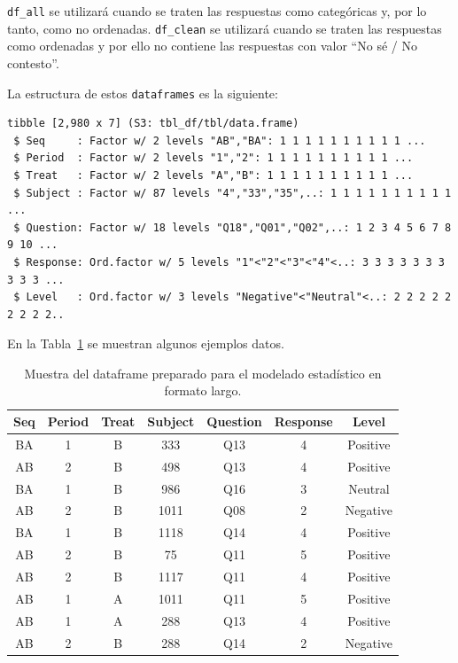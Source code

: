 \documentclass[
  12pt,
  a4paper,
  extrafontsizes,
  onecolumn,
  openright,
  table]{memoir}
\begin{document}
\texttt{df\_all} se utilizará cuando se traten las respuestas como
categóricas y, por lo tanto, como no ordenadas. \texttt{df\_clean} se
utilizará cuando se traten las respuestas como ordenadas y por ello no
contiene las respuestas con valor \enquote{No sé / No contesto}.

La estructura de estos \texttt{dataframes} es la siguiente:

\begin{verbatim}
tibble [2,980 x 7] (S3: tbl_df/tbl/data.frame)
 $ Seq     : Factor w/ 2 levels "AB","BA": 1 1 1 1 1 1 1 1 1 1 ...
 $ Period  : Factor w/ 2 levels "1","2": 1 1 1 1 1 1 1 1 1 1 ...
 $ Treat   : Factor w/ 2 levels "A","B": 1 1 1 1 1 1 1 1 1 1 ...
 $ Subject : Factor w/ 87 levels "4","33","35",..: 1 1 1 1 1 1 1 1 1 1 ...
 $ Question: Factor w/ 18 levels "Q18","Q01","Q02",..: 1 2 3 4 5 6 7 8 9 10 ...
 $ Response: Ord.factor w/ 5 levels "1"<"2"<"3"<"4"<..: 3 3 3 3 3 3 3 3 3 3 ...
 $ Level   : Ord.factor w/ 3 levels "Negative"<"Neutral"<..: 2 2 2 2 2 2 2 2 2..
\end{verbatim}

En la Tabla~\ref{tbl-df_clean} se muestran algunos ejemplos datos.

\hypertarget{tbl-df_clean}{}
\begin{longtable}{ccccccc}
\caption{\label{tbl-df_clean}Muestra del dataframe preparado para el modelado estadístico en formato
largo. }\tabularnewline

\toprule
Seq & Period & Treat & Subject & Question & Response & Level \\ 
\midrule
BA & 1 & B & 333 & Q13 & 4 & Positive \\ 
AB & 2 & B & 498 & Q13 & 4 & Positive \\ 
BA & 1 & B & 986 & Q16 & 3 & Neutral \\ 
AB & 2 & B & 1011 & Q08 & 2 & Negative \\ 
BA & 1 & B & 1118 & Q14 & 4 & Positive \\ 
AB & 2 & B & 75 & Q11 & 5 & Positive \\ 
AB & 2 & B & 1117 & Q11 & 4 & Positive \\ 
AB & 1 & A & 1011 & Q11 & 5 & Positive \\ 
AB & 1 & A & 288 & Q13 & 4 & Positive \\ 
AB & 2 & B & 288 & Q14 & 2 & Negative \\ 
\bottomrule
\end{longtable}

\end{document}
